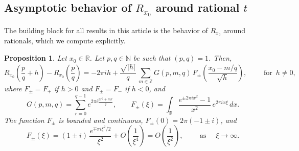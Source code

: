 \documentclass[11pt,reqno]{amsart}
\newtheorem{prop}[thm]{Proposition}
\theoremstyle{definition}
\begin{document}
\subsection{Asymptotic behavior of $R_{x_0}$ around rational $t$}\label{sec:Asymptotic_Behavior_Rationals}
The building block for all results in this article is the behavior of $R_{x_0}$ around rationals, which we compute explicitly. 
\begin{prop}\label{thm:AsymototicRationals}
Let $x_0 \in \mathbb R$.
Let $p,q \in \mathbb N$ be such that $(p,q)=1$. Then, 
\begin{equation}
R_{x_0}\left( \frac{p}{q} + h  \right)  - R_{x_0}\left( \frac{p}{q} \right) =  - 2\pi i h + \frac{\sqrt{|h|}}{q} \,  \sum_{m \in \mathbb Z} G(p,m,q)  \, F_\pm \left( \frac{x_0 - m/q}{\sqrt{h}} \right), 
\qquad \text{ for } \,  h \neq 0, 
\end{equation}
where $F_\pm = F_+$ if $h > 0$ and $F_\pm = F_-$ if $h < 0$, and
\begin{equation}
G(p,m,q) = \sum_{r=0}^{q-1} e^{2\pi i \frac{pr^2 + mr}{q}}, \qquad 
F_\pm(\xi) = \int_{\mathbb R} \frac{e^{\pm 2\pi i x^2} - 1}{x^2} \, e^{2\pi i x \xi} \, dx.
\end{equation}
The function $F_\pm$ is bounded and continuous, 
$F_\pm(0) = 2\pi (-1 \pm i)$, 
and 
\begin{equation}
 F_\pm(\xi) =  (1 \pm i) \, \frac{e^{\mp \pi i \xi^2/2}}{\xi^2} + O\left( \frac{1}{\xi^4} \right)  = O\left( \frac{1}{\xi^2} \right), \qquad \text{ as } \quad  \xi \to \infty.  
\end{equation}
\end{prop}
\end{document}
